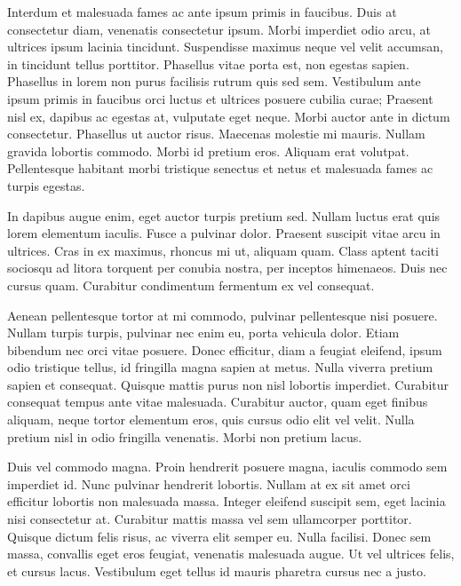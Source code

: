 Interdum et malesuada fames ac ante ipsum primis in faucibus. Duis at consectetur diam, venenatis consectetur ipsum. Morbi imperdiet odio arcu, at ultrices ipsum lacinia tincidunt. Suspendisse maximus neque vel velit accumsan, in tincidunt tellus porttitor. Phasellus vitae porta est, non egestas sapien. Phasellus in lorem non purus facilisis rutrum quis sed sem. Vestibulum ante ipsum primis in faucibus orci luctus et ultrices posuere cubilia curae; Praesent nisl ex, dapibus ac egestas at, vulputate eget neque. Morbi auctor ante in dictum consectetur. Phasellus ut auctor risus. Maecenas molestie mi mauris. Nullam gravida lobortis commodo. Morbi id pretium eros. Aliquam erat volutpat. Pellentesque habitant morbi tristique senectus et netus et malesuada fames ac turpis egestas.

In dapibus augue enim, eget auctor turpis pretium sed. Nullam luctus erat quis lorem elementum iaculis. Fusce a pulvinar dolor. Praesent suscipit vitae arcu in ultrices. Cras in ex maximus, rhoncus mi ut, aliquam quam. Class aptent taciti sociosqu ad litora torquent per conubia nostra, per inceptos himenaeos. Duis nec cursus quam. Curabitur condimentum fermentum ex vel consequat.

Aenean pellentesque tortor at mi commodo, pulvinar pellentesque nisi posuere. Nullam turpis turpis, pulvinar nec enim eu, porta vehicula dolor. Etiam bibendum nec orci vitae posuere. Donec efficitur, diam a feugiat eleifend, ipsum odio tristique tellus, id fringilla magna sapien at metus. Nulla viverra pretium sapien et consequat. Quisque mattis purus non nisl lobortis imperdiet. Curabitur consequat tempus ante vitae malesuada. Curabitur auctor, quam eget finibus aliquam, neque tortor elementum eros, quis cursus odio elit vel velit. Nulla pretium nisl in odio fringilla venenatis. Morbi non pretium lacus.

Duis vel commodo magna. Proin hendrerit posuere magna, iaculis commodo sem imperdiet id. Nunc pulvinar hendrerit lobortis. Nullam at ex sit amet orci efficitur lobortis non malesuada massa. Integer eleifend suscipit sem, eget lacinia nisi consectetur at. Curabitur mattis massa vel sem ullamcorper porttitor. Quisque dictum felis risus, ac viverra elit semper eu. Nulla facilisi. Donec sem massa, convallis eget eros feugiat, venenatis malesuada augue. Ut vel ultrices felis, et cursus lacus. Vestibulum eget tellus id mauris pharetra cursus nec a justo.

